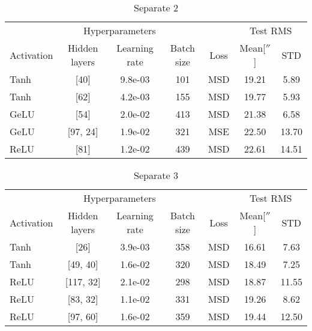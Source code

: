 \begin{table}[!htbp]
    \centering
    \caption{Separate 2}
    \begin{tabular}{lcccccc}
        \toprule
        \multicolumn{5}{c}{Hyperparameters} & \multicolumn{2}{c}{Test RMS} \\   
        \cmidrule(lr){1-5} \cmidrule(lr){6-7}
        Activation & Hidden layers & Learning rate & Batch size & Loss & Mean[$''$] & STD\\
        \midrule
        Tanh &        [40] &       9.8e-03 &        101 & MSD &    19.21 &  5.89 \\
        Tanh &        [62] &       4.2e-03 &        155 & MSD &    19.77 &  5.93 \\
        GeLU &        [54] &       2.0e-02 &        413 & MSD &    21.38 &  6.58 \\
        GeLU &    [97, 24] &       1.9e-02 &        321 & MSE &    22.50 & 13.70 \\
        ReLU &        [81] &       1.2e-02 &        439 & MSD &    22.61 & 14.51 \\
  \bottomrule
    \end{tabular}
\end{table}


\begin{table}[!htbp]
    \centering
    \caption{Separate 3}
    \begin{tabular}{lcccccc}
        \toprule
        \multicolumn{5}{c}{Hyperparameters} & \multicolumn{2}{c}{Test RMS} \\
        \cmidrule(lr){1-5} \cmidrule(lr){6-7}
        Activation & Hidden layers & Learning rate & Batch size & Loss & Mean[$''$] & STD\\
        \midrule
        Tanh &        [26] &       3.9e-03 &        358 & MSD &    16.61 &  7.63 \\
        Tanh &    [49, 40] &       1.6e-02 &        320 & MSD &    18.49 &  7.25 \\
        ReLU &   [117, 32] &       2.1e-02 &        298 & MSD &    18.87 & 11.55 \\
        ReLU &    [83, 32] &       1.1e-02 &        331 & MSD &    19.26 &  8.62 \\
        ReLU &    [97, 60] &       1.6e-02 &        359 & MSD &    19.44 & 12.50 \\
  \bottomrule
    \end{tabular}
\end{table}


